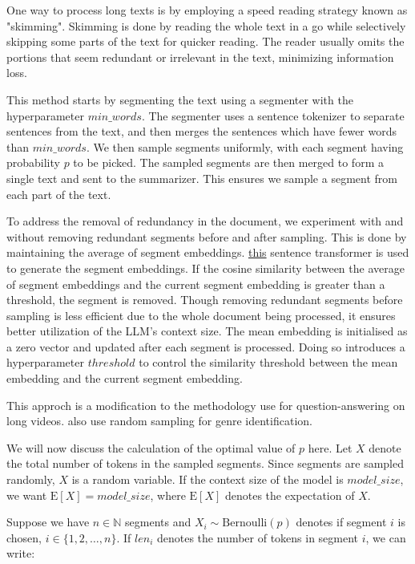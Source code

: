 One way to process long texts is by employing a speed reading strategy known as "skimming".
Skimming is done by reading the whole text in a go while selectively skipping some
parts of the text for quicker reading.
The reader usually omits the portions that seem redundant or irrelevant in the text,
minimizing information loss.

This method starts by segmenting the text using a segmenter with the hyperparameter $min\_words$.
The segmenter uses a sentence tokenizer to separate sentences from the text, and then
merges the sentences which have fewer words than $min\_words$.
We then sample segments uniformly, with each segment having probability $p$ to be picked.
The sampled segments are then merged to form a single text and sent to the summarizer.
This ensures we sample a segment from each part of the text.

To address the removal of redundancy in the document, we experiment with and without removing
redundant segments before and after sampling.
This is done by maintaining the average of segment embeddings.
\href{https://huggingface.co/sentence-transformers/all-MiniLM-L6-v2}{this} sentence transformer
is used to generate the segment embeddings.
If the cosine similarity between the average of segment embeddings and the current segment
embedding is greater than a threshold, the segment is removed.
Though removing redundant segments before sampling is less efficient due to the whole document
being processed, it ensures better utilization of the LLM's context size.
The mean embedding is initialised as a zero vector and updated after each segment is processed.
Doing so introduces a hyperparameter $threshold$ to control the similarity threshold between the
mean embedding and the current segment embedding.

This approch is a modification to the methodology \citet{wang2024videoagent} use for
question-answering on long videos. \citet{worsham-kalita-2018-genre} also use random sampling
for genre identification.

We will now discuss the calculation of the optimal value of $p$ here.
Let $X$ denote the total number of tokens in the sampled segments.
Since segments are sampled randomly, $X$ is a random variable.
If the context size of the model is $model\_size$, we want $\mathrm{E}[X] = model\_size$,
where $\mathrm{E}[X]$ denotes the expectation of $X$.

Suppose we have $n \in \mathbb{N}$ segments and $X_i \sim \mathrm{Bernoulli}(p)$ denotes
if segment $i$ is chosen, $i \in \{1, 2, \dots, n\}$.
If $len_i$ denotes the number of tokens in segment $i$, we can write:

